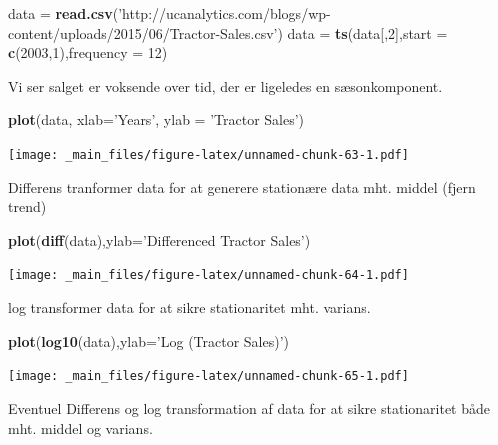\documentclass[]{book}
\newenvironment{Shaded}{\begin{snugshade}}{\end{snugshade}}
\newcommand{\DataTypeTok}[1]{\textcolor[rgb]{0.13,0.29,0.53}{#1}}
\newcommand{\DecValTok}[1]{\textcolor[rgb]{0.00,0.00,0.81}{#1}}
\newcommand{\KeywordTok}[1]{\textcolor[rgb]{0.13,0.29,0.53}{\textbf{#1}}}
\newcommand{\NormalTok}[1]{#1}
\newcommand{\StringTok}[1]{\textcolor[rgb]{0.31,0.60,0.02}{#1}}
\begin{document}
\begin{Shaded}
\begin{Highlighting}[]
\NormalTok{data =}\StringTok{ }\KeywordTok{read.csv}\NormalTok{(}\StringTok{'http://ucanalytics.com/blogs/wp-content/uploads/2015/06/Tractor-Sales.csv'}\NormalTok{)}
\NormalTok{data =}\StringTok{ }\KeywordTok{ts}\NormalTok{(data[,}\DecValTok{2}\NormalTok{],}\DataTypeTok{start =} \KeywordTok{c}\NormalTok{(}\DecValTok{2003}\NormalTok{,}\DecValTok{1}\NormalTok{),}\DataTypeTok{frequency =} \DecValTok{12}\NormalTok{)}
\end{Highlighting}
\end{Shaded}

Vi ser salget er voksende over tid, der er ligeledes en sæsonkomponent.

\begin{Shaded}
\begin{Highlighting}[]
\KeywordTok{plot}\NormalTok{(data, }\DataTypeTok{xlab=}\StringTok{'Years'}\NormalTok{, }\DataTypeTok{ylab =} \StringTok{'Tractor Sales'}\NormalTok{)}
\end{Highlighting}
\end{Shaded}

\texttt{[image: \_main\_files/figure-latex/unnamed-chunk-63-1.pdf]}

Differens tranformer data for at generere stationære data mht. middel (fjern trend)

\begin{Shaded}
\begin{Highlighting}[]
\KeywordTok{plot}\NormalTok{(}\KeywordTok{diff}\NormalTok{(data),}\DataTypeTok{ylab=}\StringTok{'Differenced Tractor Sales'}\NormalTok{)}
\end{Highlighting}
\end{Shaded}

\texttt{[image: \_main\_files/figure-latex/unnamed-chunk-64-1.pdf]}

log transformer data for at sikre stationaritet mht. varians.

\begin{Shaded}
\begin{Highlighting}[]
\KeywordTok{plot}\NormalTok{(}\KeywordTok{log10}\NormalTok{(data),}\DataTypeTok{ylab=}\StringTok{'Log (Tractor Sales)'}\NormalTok{)}
\end{Highlighting}
\end{Shaded}

\texttt{[image: \_main\_files/figure-latex/unnamed-chunk-65-1.pdf]}

Eventuel Differens og log transformation af data for at sikre stationaritet både mht. middel og varians.
\end{document}
